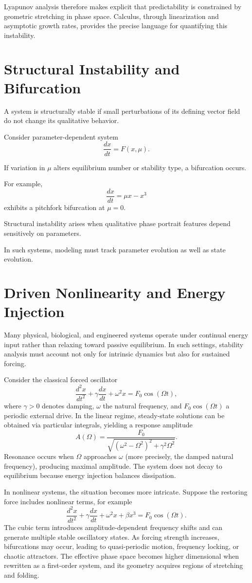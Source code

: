 \documentclass[12pt]{book}
\begin{document}
Lyapunov analysis therefore makes explicit that predictability is constrained by geometric stretching in phase space. Calculus, through linearization and asymptotic growth rates, provides the precise language for quantifying this instability.

\section{Structural Instability and Bifurcation}

A system is structurally stable if small perturbations of its defining vector field do not change its qualitative behavior.

Consider parameter-dependent system
\[
\frac{dx}{dt} = F(x,\mu).
\]

If variation in $\mu$ alters equilibrium number or stability type, a bifurcation occurs.

For example,
\[
\frac{dx}{dt} = \mu x - x^3
\]
exhibits a pitchfork bifurcation at $\mu = 0$.

Structural instability arises when qualitative phase portrait features depend sensitively on parameters.

In such systems, modeling must track parameter evolution as well as state evolution.
\section{Driven Nonlinearity and Energy Injection}

Many physical, biological, and engineered systems operate under continual energy input rather than relaxing toward passive equilibrium. In such settings, stability analysis must account not only for intrinsic dynamics but also for sustained forcing.

Consider the classical forced oscillator
\[
\frac{d^2x}{dt^2} + \gamma \frac{dx}{dt} + \omega^2 x = F_0 \cos(\Omega t),
\]
where $\gamma > 0$ denotes damping, $\omega$ the natural frequency, and $F_0 \cos(\Omega t)$ a periodic external drive. In the linear regime, steady-state solutions can be obtained via particular integrals, yielding a response amplitude
\[
A(\Omega) = \frac{F_0}{\sqrt{(\omega^2 - \Omega^2)^2 + \gamma^2 \Omega^2}}.
\]
Resonance occurs when $\Omega$ approaches $\omega$ (more precisely, the damped natural frequency), producing maximal amplitude. The system does not decay to equilibrium because energy injection balances dissipation.

In nonlinear systems, the situation becomes more intricate. Suppose the restoring force includes nonlinear terms, for example
\[
\frac{d^2x}{dt^2} + \gamma \frac{dx}{dt} + \omega^2 x + \beta x^3 = F_0 \cos(\Omega t).
\]
The cubic term introduces amplitude-dependent frequency shifts and can generate multiple stable oscillatory states. As forcing strength increases, bifurcations may occur, leading to quasi-periodic motion, frequency locking, or chaotic attractors. The effective phase space becomes higher dimensional when rewritten as a first-order system, and its geometry acquires regions of stretching and folding.
\end{document}
